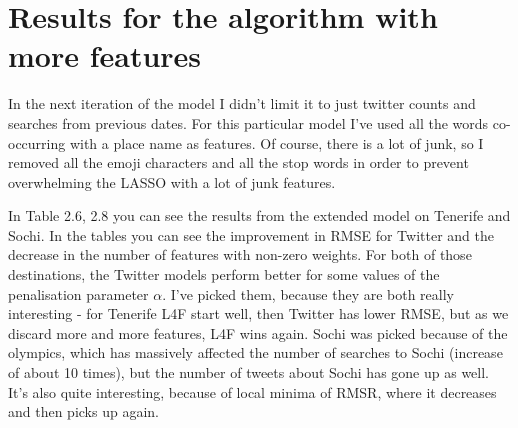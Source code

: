 \documentclass[minf,frontabs,twoside,singlespacing,parskip]{infthesis}
\begin{document}

\newpage
\section{Results for the algorithm with more features}
\label{sec:features}

In the next iteration of the model I didn't limit it to just twitter counts and searches from previous dates. For this particular model I've used all the words co-occurring with a place name as features. Of course, there is a lot of junk, so I removed all the emoji characters and all the stop words in order to prevent overwhelming the LASSO with a lot of junk features.

In Table 2.6, 2.8 you can see the results from the extended model on Tenerife and Sochi. In the tables you can see the improvement in RMSE for Twitter and the decrease in the number of features with non-zero weights. For both of those destinations, the Twitter models perform better for some values of the penalisation parameter $\alpha$. I've picked them, because they are both really interesting - for Tenerife L4F start well, then Twitter has lower RMSE, but as we discard more and more features, L4F wins again. Sochi was picked because of the olympics, which has massively affected the number of searches to Sochi (increase of about 10 times), but the number of tweets about Sochi has gone up as well. 
It's also quite interesting, because of local minima of RMSR, where it decreases and then picks up again.
\end{document}
